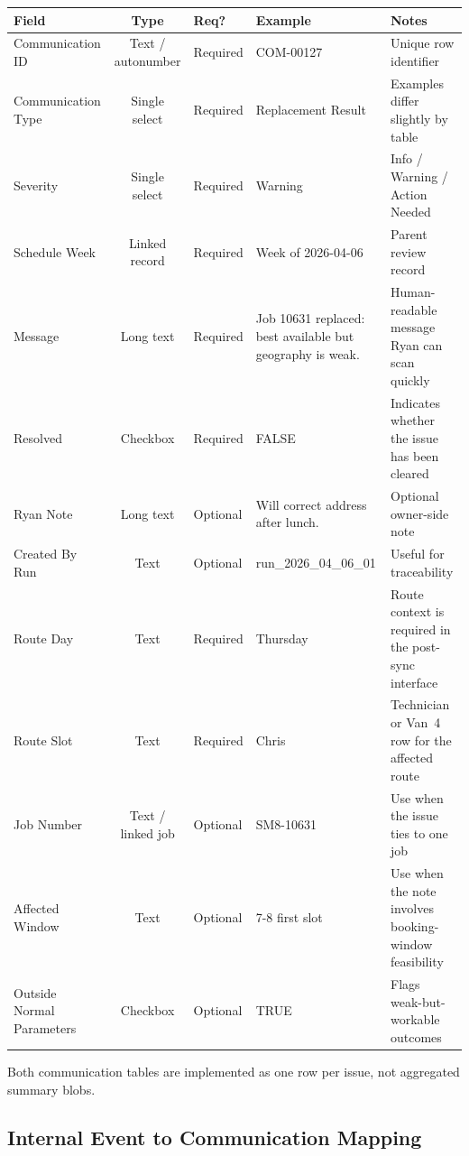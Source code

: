 \documentclass[12pt]{article}
\begin{document}
\medskip
{\small
\begin{longtable}{lclp{2.8cm}p{3.2cm}}
\toprule
\textbf{Field} & \textbf{Type} & \textbf{Req?} & \textbf{Example} & \textbf{Notes} \\
\midrule
Communication ID   & Text / autonumber & Required & COM-00127 & Unique row identifier \\
Communication Type & Single select    & Required & Replacement Result & Examples differ slightly by table \\
Severity           & Single select    & Required & Warning & Info / Warning / Action Needed \\
Schedule Week      & Linked record    & Required & Week of 2026-04-06 & Parent review record \\
Message            & Long text & Required & Job 10631 replaced: best available but geography is weak. & Human-readable message Ryan can scan quickly \\
Resolved           & Checkbox  & Required & FALSE & Indicates whether the issue has been cleared \\
Ryan Note          & Long text & Optional & Will correct address after lunch. & Optional owner-side note \\
Created By Run     & Text      & Optional & run\_2026\_04\_06\_01 & Useful for traceability \\
Route Day          & Text      & Required & Thursday & Route context is required in the post-sync interface \\
Route Slot         & Text      & Required & Chris & Technician or Van~4 row for the affected route \\
Job Number         & Text / linked job & Optional & SM8-10631 & Use when the issue ties to one job \\
Affected Window    & Text      & Optional & 7-8 first slot & Use when the note involves booking-window feasibility \\
Outside Normal Parameters & Checkbox & Optional & TRUE & Flags weak-but-workable outcomes \\
\bottomrule
\end{longtable}
}

Both communication tables are implemented as one row per issue, not aggregated summary blobs.

\subsection*{Internal Event to Communication Mapping}
\end{document}
